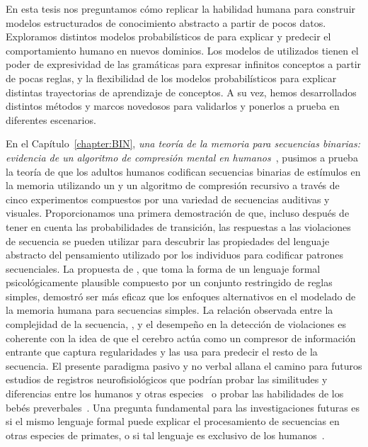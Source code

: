 
En esta tesis nos preguntamos cómo replicar la habilidad humana para construir modelos estructurados de conocimiento abstracto a partir de pocos datos. Exploramos distintos modelos probabilísticos de \lot para explicar y predecir el comportamiento humano en nuevos dominios. Los modelos de \lot utilizados tienen el poder de expresividad de las gramáticas para expresar infinitos conceptos a partir de pocas reglas, y la flexibilidad de los modelos probabilísticos para explicar distintas trayectorias de aprendizaje de conceptos. A su vez, hemos desarrollados distintos métodos y marcos novedosos para validarlos y ponerlos a prueba en diferentes escenarios.

En el Capítulo~\ref{chapter:BIN}, \textit{una teoría de la memoria para secuencias binarias: evidencia de un algoritmo de compresión mental en humanos~\cite{planton2021memory}}, pusimos a prueba la teoría de que los adultos humanos codifican secuencias binarias de estímulos en la memoria utilizando un \lot y un algoritmo de compresión recursivo a través de cinco experimentos compuestos por una variedad de secuencias auditivas y visuales. Proporcionamos una primera demostración de que, incluso después de tener en cuenta las probabilidades de transición, las respuestas a las violaciones de secuencia se pueden utilizar para descubrir las propiedades del lenguaje abstracto del pensamiento utilizado por los individuos para codificar patrones secuenciales. La propuesta de \grambin, que toma la forma de un lenguaje formal psicológicamente plausible compuesto por un conjunto restringido de reglas simples, demostró ser más eficaz que los enfoques alternativos en el modelado de la memoria humana para secuencias simples. La relación observada entre la complejidad de la secuencia, \mdlbin, y el desempeño en la detección de violaciones es coherente con la idea de que el cerebro actúa como un compresor de información entrante que captura regularidades y las usa para predecir el resto de la secuencia. El presente paradigma pasivo y no verbal allana el camino para futuros estudios de registros neurofisiológicos que podrían probar las similitudes y diferencias entre los humanos y otras especies~\cite{f13} o probar las habilidades de los bebés preverbales~\cite{f70}. Una pregunta fundamental para las investigaciones futuras es si el mismo lenguaje formal puede explicar el procesamiento de secuencias en otras especies de primates, o si tal lenguaje es exclusivo de los humanos~\cite{f6}.

